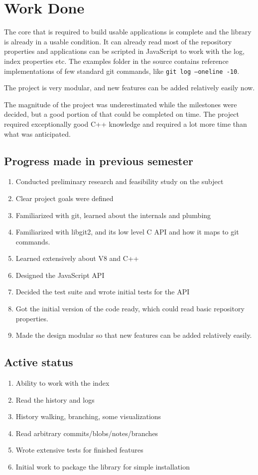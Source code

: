 \chapter{Work Done}

The core that is required to build usable applications is complete and the
library is already in a usable condition. It can already read most of the
repository properties and applications can be scripted in JavaScript to work
with the log, index properties etc. The examples folder in the source contains
reference implementations of few standard git commands, like \texttt{git log
  --oneline -10}.

The project is very modular, and new features can be added relatively easily
now.

The magnitude of the project was underestimated while the milestones were
decided, but a good portion of that could be completed on time. The project
required exceptionally good C++ knowledge and required a lot more time than what
was anticipated.

\section{Progress made in previous semester}
\begin{enumerate}
	\item Conducted preliminary research and feasibility study on the subject
	\item Clear project goals were defined
	\item Familiarized with git, learned about the internals and plumbing
    \item Familiarized with libgit2, and its low level C API and how it maps to
      git commands.
    \item Learned extensively about V8 and C++
    \item Designed the JavaScript API
    \item Decided the test suite and wrote initial tests for the API
    \item Got the initial version of the code ready, which could read basic
      repository properties.
    \item Made the design modular so that new features can be added relatively
      easily.
\end{enumerate}

\section{Active status}
\begin{enumerate}
	\item Ability to work with the index
    \item Read the history and logs
    \item History walking, branching, some visualizations
    \item Read arbitrary commits/blobs/notes/branches
    \item Wrote extensive tests for finished features
    \item Initial work to package the library for simple installation
\end{enumerate}

